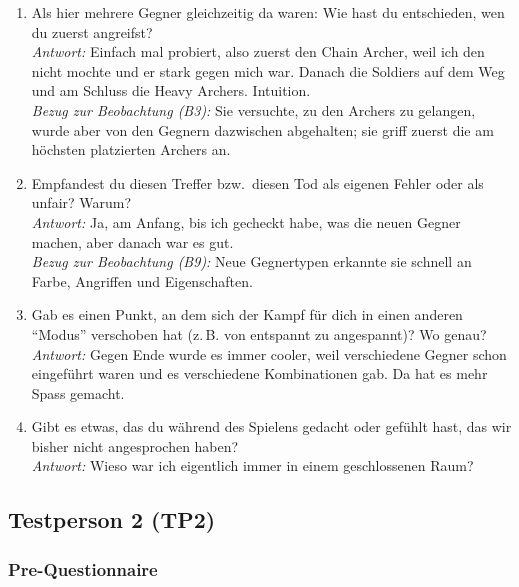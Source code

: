 \documentclass[../Main.tex]{subfiles}
\begin{document}
\begin{enumerate}[label=\textbf{I\arabic*}, leftmargin=1.5cm, itemsep=1em]
\item Als hier mehrere Gegner gleichzeitig da waren: Wie hast du entschieden, wen du zuerst angreifst? \\
    \textit{Antwort:} Einfach mal probiert, also zuerst den Chain Archer, weil ich den nicht mochte und er stark gegen mich war. Danach die Soldiers auf dem Weg und am Schluss die Heavy Archers. Intuition. \\
    \textit{Bezug zur Beobachtung (B3):} Sie versuchte, zu den Archers zu gelangen, wurde aber von den Gegnern dazwischen abgehalten; sie griff zuerst die am höchsten platzierten Archers an.

\item Empfandest du diesen Treffer bzw.\ diesen Tod als eigenen Fehler oder als unfair? Warum? \\
    \textit{Antwort:} Ja, am Anfang, bis ich gecheckt habe, was die neuen Gegner machen, aber danach war es gut. \\
    \textit{Bezug zur Beobachtung (B9):} Neue Gegnertypen erkannte sie schnell an Farbe, Angriffen und Eigenschaften.

\item Gab es einen Punkt, an dem sich der Kampf für dich in einen anderen \enquote{Modus} verschoben hat (z.\,B. von entspannt zu angespannt)? Wo genau? \\
    \textit{Antwort:} Gegen Ende wurde es immer cooler, weil verschiedene Gegner schon eingeführt waren und es verschiedene Kombinationen gab. Da hat es mehr Spass gemacht.

\item Gibt es etwas, das du während des Spielens gedacht oder gefühlt hast, das wir bisher nicht angesprochen haben? \\
    \textit{Antwort:} Wieso war ich eigentlich immer in einem geschlossenen Raum?
\end{enumerate}

\subsection{Testperson 2 (TP2)}

\subsubsection{Pre-Questionnaire}
\end{document}
